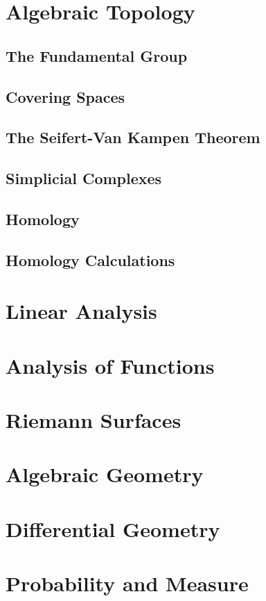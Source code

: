 \documentclass[12pt]{book}
\theoremstyle{definition}
\theoremstyle{remark}
\begin{document}
	\chapter{Algebraic Topology}
		\section{The Fundamental Group}
		
		\section{Covering Spaces}
		
		\section{The Seifert-Van Kampen Theorem}
		
		\section{Simplicial Complexes}
		
		\section{Homology}
		
		\section{Homology Calculations}
		
	\chapter{Linear Analysis}
	
	\chapter{Analysis of Functions}
	
	\chapter{Riemann Surfaces}
	
	\chapter{Algebraic Geometry}
	
	\chapter{Differential Geometry}
	
	\chapter{Probability and Measure}
	
	\backmatter
		\printindex
\end{document}

